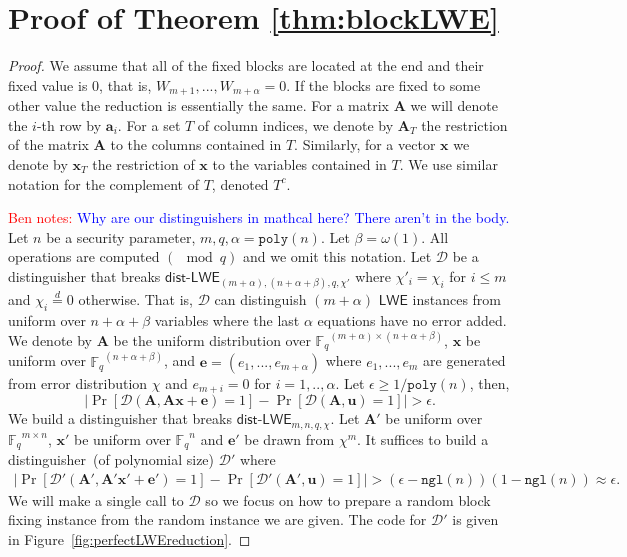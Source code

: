 \documentclass[11pt]{article}
\newcommand{\figref}[1]{\mbox{Figure~\ref{#1}}}
\newcommand{\class}[1]{{\ensuremath{\mathsf{#1}}}}
\newcommand{\vect}[1]{\ensuremath{\textbf{#1}}}
\newcommand{\Fq}{\ensuremath{\mathbb{F}_q}}
\newcommand{\D}{\mathcal{D}}
\newcommand{\poly}{\ensuremath{\mathtt{poly}}\xspace}
\newcommand{\ngl}{\ensuremath{\mathtt{ngl}}\xspace}
\newcommand{\LWE}{\class{LWE}}
\newcommand{\distLWE}{\ensuremath{\class{dist\mbox{-}LWE}}}
\newcommand{\authnote}[2]{{\textcolor{red}{\textsf{#1 notes: }\textcolor{blue}{ #2}}\marginpar{\textcolor{red}{\textbf{!!!!!}}}}}
\newcommand{\authnote}[2]{}
\newcommand{\bnote}[1]{{\authnote{Ben}{#1}}}
\newcommand{\lnote}[1]{{\authnote{Leo}{#1}}}
\newcommand{\ve}{\vect{e}}
\newcommand{\vA}{\vect{A}}
\newcommand{\vx}{\vect{x}}
\newcommand{\va}{\vect{a}}
\newcommand{\vu}{\vect{u}}
\begin{document}
\section{Proof of Theorem \ref{thm:blockLWE}}
\label{sec:proof of block theorem}

\begin{proof}
We assume that all of the fixed blocks are located at the end and their fixed value is $0$, that is, $W_{m+1}, ..., W_{m+\alpha} =0$.  If the blocks are fixed to some other value the reduction is essentially the same.  For a matrix $\vA$ we will denote the $i$-th row by $\va_i$.  For a set $T$ of column indices, we denote by $\vA_T$ the restriction of the matrix $\vA$ to the columns contained in $T$.  Similarly, for a vector $\vx$ we denote by $\vx_T$ the restriction of $\vx$ to the variables contained in $T$.  We use similar notation for the complement of $T$, denoted $T^c$.


\bnote{Why are our distinguishers in mathcal here?  There aren't in the body.}
Let $n$ be a security parameter, $m ,q , \alpha= \poly(n)$.  Let $\beta = \omega(1)$.  All operations are computed $(\mod q)$ and we omit this notation.  
Let $\D$ be a distinguisher that breaks $\distLWE_{(m+\alpha), (n+\alpha+\beta), q, \chi'}$ where $\chi'_i = \chi_i$ for $i\leq m$ and $\chi_i \overset{d}= 0$ otherwise.  That is, $\D$ can distinguish $(m+\alpha)$ $\LWE$ instances from uniform over $n+\alpha+\beta$ variables where the last $\alpha$ equations have no error added.  We denote by $\vA$ be the uniform distribution over $\Fq^{(m+\alpha)\times(n+\alpha+\beta)}$, $\vx$ be uniform over $\Fq^{(n+\alpha+\beta)}$, and $\ve= (e_1,..., e_{m+\alpha})$ where $e_1,..., e_m$ are generated from error distribution $\chi$ and $e_{m+i} =0$ for $i=1,..,\alpha$. Let $\epsilon \geq 1/\poly(n)$, then, 
\[
|\Pr[\D(\vA, \vA\vx+\ve) = 1] - \Pr[\D(\vA, \vu) =1]|> \epsilon.
\]
We build a distinguisher that breaks $\distLWE_{m, n, q, \chi}$.  Let $\vA'$ be uniform over $\Fq^{m\times n}$, $\vx'$ be uniform over $\Fq^n$ and $\ve'$ be drawn from $\chi^m$.  It suffices to build a distinguisher~(of polynomial size) $\D'$  where 
\begin{align}
\label{eq:block LWE dist}
|\Pr[\D'(\vA', \vA'\vx'+\ve') = 1] - \Pr[\D'(\vA', \vu) =1]|> (\epsilon - \ngl(n))(1-\ngl(n)) \approx \epsilon.
\end{align}
We will make a single call to $\D$ so we focus on how to prepare a random block fixing instance from the random instance we are given.  The code for $\D'$ is given in \figref{fig:perfectLWEreduction}.


\end{proof}
\end{document}
